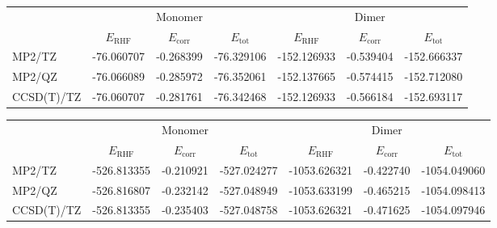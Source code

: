 \documentclass[a4paper,12pt, parskip=half]{scrartcl}
\begin{document}
\begin{table}[!b]
	\label{tab:mono-dim}
	\begin{subtable}[c]{1.0\textwidth}
		\centering
		\begin{tabular}{l|ccc|ccc}
			\toprule
			           &                   & Monomer            &                   &                   & Dimer              &                   \\
			           & $ E_\mathrm{RHF}$ & $ E_\mathrm{corr}$ & $ E_\mathrm{tot}$ & $ E_\mathrm{RHF}$ & $ E_\mathrm{corr}$ & $ E_\mathrm{tot}$ \\
			\midrule
			MP2/TZ     & -76.060707        & -0.268399          & -76.329106        & -152.126933       & -0.539404          & -152.666337       \\
			MP2/QZ     & -76.066089        & -0.285972          & -76.352061        & -152.137665       & -0.574415          & -152.712080       \\
			CCSD(T)/TZ & -76.060707        & -0.281761          & -76.342468        & -152.126933       & -0.566184          & -152.693117       \\
			\bottomrule
		\end{tabular}
	\end{subtable}

	\begin{subtable}[c]{1.0\textwidth}
		\centering
		\begin{adjustbox}{width=\columnwidth,center}
			\begin{tabular}{l|ccc|ccc}
				\toprule
				           &                   & Monomer            &                   &                   & Dimer              &                   \\
				           & $ E_\mathrm{RHF}$ & $ E_\mathrm{corr}$ & $ E_\mathrm{tot}$ & $ E_\mathrm{RHF}$ & $ E_\mathrm{corr}$ & $ E_\mathrm{tot}$ \\
				\midrule
				MP2/TZ     & -526.813355       & -0.210921          & -527.024277       & -1053.626321      & -0.422740          & -1054.049060      \\
				MP2/QZ     & -526.816807       & -0.232142          & -527.048949       & -1053.633199      & -0.465215          & -1054.098413      \\
				CCSD(T)/TZ & -526.813355       & -0.235403          & -527.048758       & -1053.626321      & -0.471625          & -1054.097946      \\
				\bottomrule
			\end{tabular}
		\end{adjustbox}
	\end{subtable}
\end{table}
\end{document}

